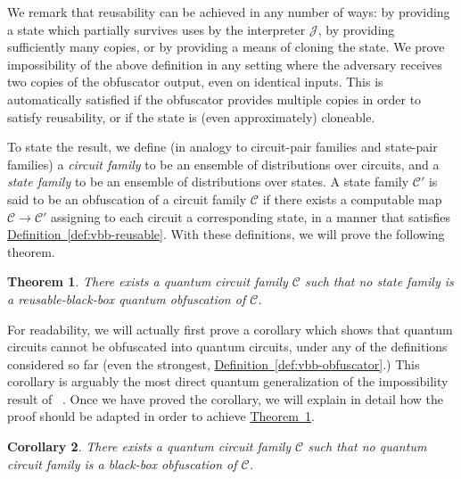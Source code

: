 \documentclass[11pt]{article}
\numberwithin{equation}{section}
\newtheorem{theorem}{Theorem}
\newtheorem{corollary}[theorem]{Corollary}
\newcommand{\expref}[2]{\texorpdfstring{\hyperref[#2]{#1~\ref{#2}}}{#1~\ref{#2}}}
\newcommand{\algo}{\mathcal}
\newcommand{\ga}[1]{{ \textcolor{purple}{(Gorjan:  #1)}}{}}
\begin{document}
{We remark that reusability can be achieved in any number of ways: by providing a state which partially survives uses by the interpreter $\algo J$, by providing sufficiently many copies, or by providing a means of cloning the state. We prove impossibility of the above definition in any setting where the adversary receives two copies of the obfuscator output, even on identical inputs. This is automatically satisfied if the obfuscator provides multiple copies in order to satisfy reusability, or if the state is (even approximately) cloneable. 

To state the result, we define (in analogy to circuit-pair families and state-pair families) a \emph{circuit family} to be an ensemble of distributions over circuits, and a \emph{state family} to be an ensemble of distributions over states. A state family $\mathcal C'$ is said to be an obfuscation of a circuit family $\mathcal C$ if there exists a computable map $\mathcal C \rightarrow \mathcal C'$ assigning to each circuit a corresponding state, in a manner that satisfies \expref{Definition}{def:vbb-reusable}. With these definitions, we will prove the following theorem.

\begin{theorem}\label{thm:single-impossibility}
There exists a quantum circuit family $\mathcal C$ such that no state family is a reusable-black-box quantum obfuscation of $\mathcal C$.
\end{theorem}

For readability, we will actually first prove a corollary which shows that quantum circuits cannot be obfuscated into quantum circuits, under any of the definitions considered so far (even the strongest, \expref{Definition}{def:vbb-obfuscator}.) This corollary is arguably the most direct quantum generalization of the impossibility result of ~\cite{BGIRSVY01}. Once we have proved the corollary, we will explain in detail how the proof should be adapted in order to achieve \expref{Theorem}{thm:single-impossibility}.

\begin{corollary}
There exists a quantum circuit family $\mathcal C$ such that no quantum circuit family is a black-box obfuscation of $\mathcal C$.
\end{corollary}

\noindent \ga{Stopped editing here.} \newpage

}
\end{document}
